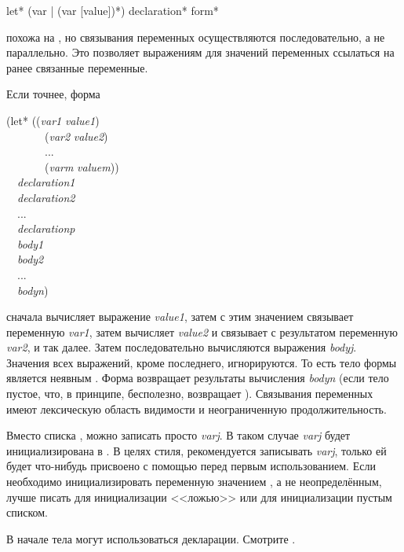 \begin{defspec}
let* ({var | (var [value])}*) {declaration}* {form}*

 похожа на , но связывания переменных осуществляются
последовательно, а не параллельно. Это позволяет выражениям для значений
переменных ссылаться на ранее связанные переменные.

Если точнее, форма
\begin{lisp}
(let* ((\emph{var1} \emph{value1}) \\
~~~~~~~(\emph{var2} \emph{value2}) \\
~~~~~~~... \\
~~~~~~~(\emph{varm} \emph{valuem})) \\
~~\emph{declaration1} \\
~~\emph{declaration2} \\
~~... \\
~~\emph{declarationp} \\
~~\emph{body1} \\
~~\emph{body2} \\
~~... \\
~~\emph{bodyn})
\end{lisp}
сначала вычисляет выражение \emph{value1}, затем с этим значением связывает
переменную \emph{var1}, затем вычисляет \emph{value2} и связывает с 
результатом переменную \emph{var2}, и так далее.
Затем последовательно вычисляются выражения \emph{bodyj}.
Значения всех выражений, кроме последнего, игнорируются. То есть тело формы
 является неявным .
Форма  возвращает результаты вычисления \emph{bodyn} (если тело
пустое, что, в принципе, бесполезно,  возвращает {\false}).
Связывания переменных имеют лексическую область видимости и неограниченную продолжительность.

Вместо списка , можно записать просто
\emph{varj}.
В таком случае \emph{varj} будет инициализирована в {\false}. В целях стиля,
рекомендуется записывать \emph{varj}, только ей будет что-нибудь присвоено с
помощью  перед первым использованием.
Если необходимо инициализировать переменную значением {\nil}, а не
неопределённым, лучше писать  для инициализации
<<ложью>> или  для инициализации пустым
списком.

В начале тела  могут использоваться декларации. Смотрите .
\end{defspec}

